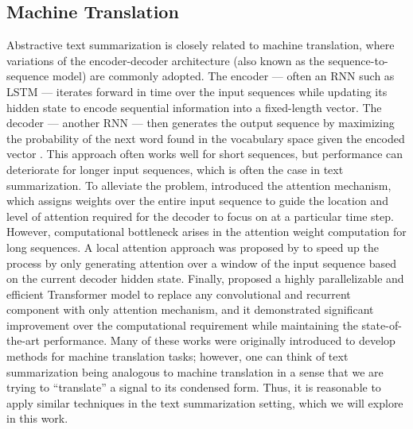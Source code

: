 \subsection{Machine Translation}
Abstractive text summarization is closely related to machine translation, where variations of the encoder-decoder architecture (also known as the sequence-to-sequence model) are commonly adopted. The encoder --- often an RNN such as LSTM --- iterates forward in time over the input sequences while updating its hidden state to encode sequential information into a fixed-length vector. The decoder --- another RNN --- then generates the output sequence by maximizing the probability of the next word found in the vocabulary space given the encoded vector \cite{sutskever2014sequence,cho2014learning}. This approach often works well for short sequences, but performance can deteriorate for longer input sequences, which is often the case in text summarization. To alleviate the problem, \cite{bahdanau2014neural} introduced the attention mechanism, which assigns weights over the entire input sequence to guide the location and level of attention required for the decoder to focus on at a particular time step. However, computational bottleneck arises in the attention weight computation for long sequences. A local attention approach was proposed by \cite{luong2015effective} to speed up the process by only generating attention over a window of the input sequence based on the current decoder hidden state. Finally, \cite{vaswani2017attention} proposed a highly parallelizable and efficient Transformer model to replace any convolutional and recurrent component with only attention mechanism, and it demonstrated significant improvement over the computational requirement while maintaining the state-of-the-art performance. Many of these works were originally introduced to develop methods for machine translation tasks; however, one can think of text summarization being analogous to machine translation in a sense that we are trying to ``translate'' a signal to its condensed form. Thus, it is reasonable to apply similar techniques in the text summarization setting, which we will explore in this work.

